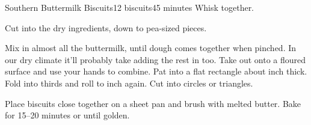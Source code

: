 \documentclass[../Cookbook.tex]{subfiles}
\begin{document}
\begin{recipe}[SouthernButtermilkBiscuits]{Southern Buttermilk Biscuits}{12 biscuits}{45 minutes}
Whisk together.


Cut into the dry ingredients, down to pea-sized pieces.

Mix in almost all the buttermilk, until dough comes together when pinched.
In our dry climate it'll probably take adding the rest in too.
Take out onto a floured surface and use your hands to combine.
Pat into a flat rectangle about  inch thick.
Fold into thirds and roll to  inch again.
Cut into circles or triangles.

Place biscuits close together on a sheet pan and brush with melted butter.
Bake for 15--20 minutes or until golden.

\end{recipe}
\end{document}
